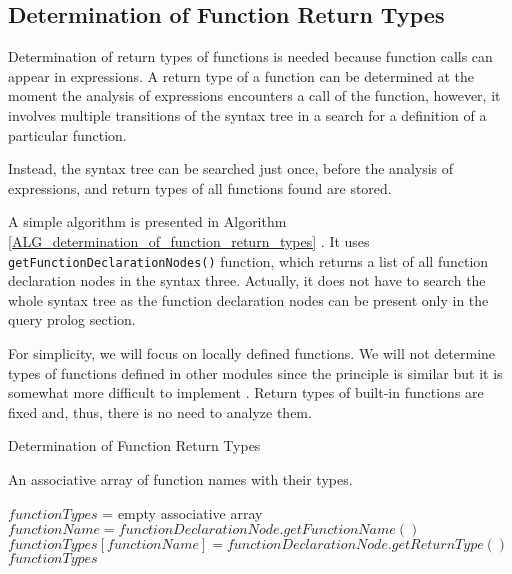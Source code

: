 \subsection{Determination of Function Return Types}
Determination of return types of functions is needed because function calls can appear in expressions. A return type of a function can be determined at the moment the analysis of expressions encounters a call of the function, however, it involves multiple transitions of the syntax tree in a search for a definition of a particular function.

Instead, the syntax tree can be searched just once, before the analysis of expressions, and return types of all functions found are stored.

A simple algorithm is presented in Algorithm \ref{ALG_determination_of_function_return_types} . It uses \texttt{getFunctionDeclarationNodes()} function, which returns a list of all function declaration nodes in the syntax three. Actually, it does not have to search the whole syntax tree as the function declaration nodes can be present only in the query prolog section. 

For simplicity, we will focus on locally defined functions. We will not determine types of functions defined in other modules since the principle is similar but it is somewhat more difficult to implement . Return types of built-in functions are fixed and, thus, there is no need to analyze them.

\begin{algorithm}
\caption{Determination of Function Return Types}
\label{ALG_determination_of_function_return_types}
\begin{algorithmic}[1]
\ENSURE An associative array of function names with their types.

\STATE $functionTypes$ = empty associative array
    \STATE $functionName = functionDeclarationNode.getFunctionName()$
    \STATE $functionTypes[functionName] = functionDeclarationNode.getReturnType()$
\ENDFOR
\RETURN $functionTypes$
\end{algorithmic}
\end{algorithm}

